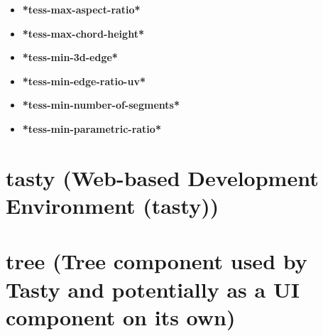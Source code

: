 \documentclass [11pt]{book}
\begin{document}
\begin{itemize}
\item {}
\label{prim:*tess-max-aspect-ratio*}
\textbf{*tess-max-aspect-ratio*}





\item {}
\label{prim:*tess-max-chord-height*}
\textbf{*tess-max-chord-height*}





\item {}
\label{prim:*tess-min-3d-edge*}
\textbf{*tess-min-3d-edge*}





\item {}
\label{prim:*tess-min-edge-ratio-uv*}
\textbf{*tess-min-edge-ratio-uv*}





\item {}
\label{prim:*tess-min-number-of-segments*}
\textbf{*tess-min-number-of-segments*}





\item {}
\label{prim:*tess-min-parametric-ratio*}
\textbf{*tess-min-parametric-ratio*}





\end{itemize}





\section{tasty (Web-based Development Environment (tasty))}

\label{sec:tasty(web-baseddevelopmentenvironment(tasty))}







\section{tree (Tree component used by Tasty and potentially as a UI component on its own)}
\end{document}
